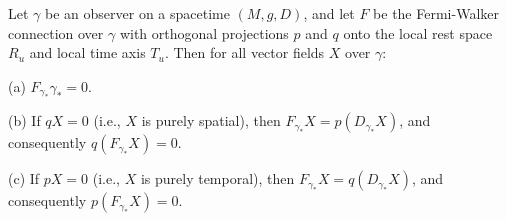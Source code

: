 Let $\gamma$ be an observer on a spacetime $(M, g, D)$, and let $F$ be the Fermi-Walker connection over $\gamma$ with orthogonal projections $p$ and $q$ onto the local rest space $R_u$ and local time axis $T_u$. Then for all vector fields $X$ over $\gamma$:

(a) $F_{\gamma_*} \gamma_* = 0$.

(b) If $qX = 0$ (i.e., $X$ is purely spatial), then $F_{\gamma_*} X = p(D_{\gamma_*} X)$, and consequently $q(F_{\gamma_*} X) = 0$.

(c) If $pX = 0$ (i.e., $X$ is purely temporal), then $F_{\gamma_*} X = q(D_{\gamma_*} X)$, and consequently $p(F_{\gamma_*} X) = 0$.
